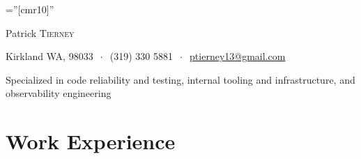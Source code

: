 \documentclass[letterpaper,10pt]{article} %
\begin{document}
\pagestyle{empty} %

\font\fb=''[cmr10]'' %

\begin{center}
{\Huge Patrick \textsc{Tierney}\bigskip }%

\vspace{-5mm}
Kirkland WA, 98033  $\ \cdot \ $
 (319) 330 5881 $\ \cdot \ $ 
\href{mailto:ptierney13@gmail.com}{ptierney13@gmail.com}


\vspace{-5mm}
 \singlespacing
 \vspace{-1mm}

Specialized in code reliability and testing, internal tooling and infrastructure, and observability engineering

\end{center}





\section{Work Experience}
\end{document}
